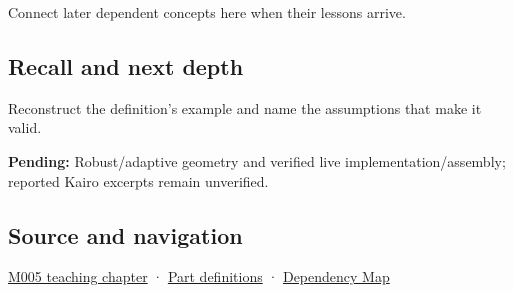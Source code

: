 Connect later dependent concepts here when their lessons arrive.

\subsection{Recall and next depth}\label{appendix-5aef4f13483a-recall-and-next-depth}

Reconstruct the definition's example and name the assumptions that make it valid.

\textbf{Pending:} Robust/adaptive geometry and verified live implementation/assembly; reported Kairo excerpts remain unverified.

\subsection{Source and navigation}\label{appendix-5aef4f13483a-source-and-navigation}

\hyperref[01-foundations-i-ch001-when-arithmetic-meets-uncertainty]{M005 teaching chapter} · \hyperref[appendix-fd090d982a15-m005---parts-77-88]{Part definitions} · \hyperref[appendix-4ad47bdd269a]{Dependency Map}
